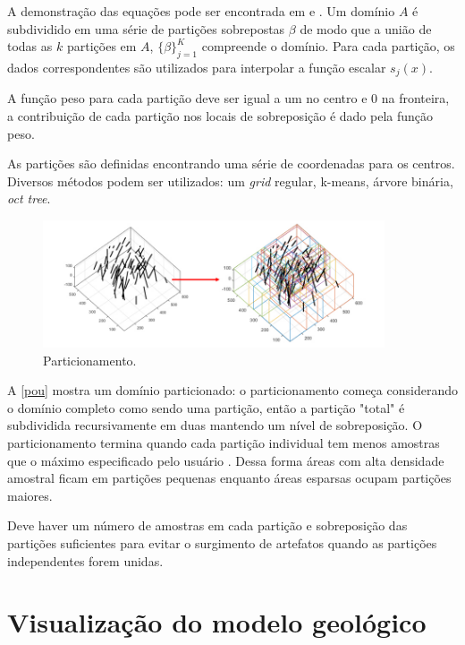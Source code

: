 A demonstração das equações pode ser encontrada em  e . Um domínio $A$ é subdividido em uma série de partições sobrepostas $\beta$ de modo que a união de todas as $k$ partições em $A$, $\{ \beta \}^K_{j=1}$ compreende o domínio. Para cada partição, os dados correspondentes são utilizados para interpolar a função escalar $s_j(x)$.

A função peso para cada partição deve ser igual a um no centro e 0 na fronteira, a contribuição de cada partição nos locais de sobreposição é dado pela função peso.

As partições são definidas encontrando uma série de coordenadas para os centros. Diversos métodos podem ser utilizados: um \textit{grid} regular, k-means, árvore binária, \textit{oct tree}.

\begin{figure}[H]
	\caption{\label{pou}Particionamento.}
	\begin{center}
		\includegraphics[width=0.9\textwidth]{capitulo_2/pou.jpg}
	\end{center}
\end{figure}

A \autoref{pou} mostra um domínio particionado: o particionamento começa considerando o domínio completo como sendo uma partição, então a partição "total" é subdividida recursivamente em duas mantendo um nível de sobreposição. O particionamento termina quando cada partição individual tem menos amostras que o máximo especificado pelo usuário \cite{martin2017implicitmodeling}. Dessa forma áreas com alta densidade amostral ficam em partições pequenas enquanto áreas esparsas ocupam partições maiores.

Deve haver um número de amostras em cada partição e sobreposição das partições suficientes para evitar o surgimento de artefatos quando as partições independentes forem unidas.

\section{Visualização do modelo geológico}

